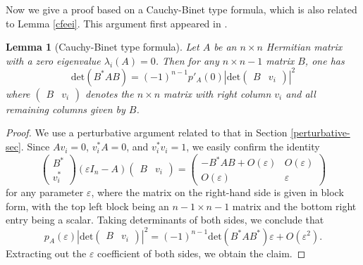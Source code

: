 \documentclass{amsart}
\newcommand\eps{\varepsilon}
\newtheorem{lemma}{Lemma}
\begin{document}
Now we give a proof based on a Cauchy-Binet type formula, which is also related to Lemma \ref{cfeei}.  This argument first appeared in \cite{DPTZ}.

\begin{lemma}[Cauchy-Binet type formula]\label{cbtf}  Let $A$ be an $n \times n$ Hermitian matrix with a zero eigenvalue $\lambda_i(A) = 0$.  Then for any $n \times n-1$ matrix $B$, one has
$$ \mathrm{det}( B^* A B ) = (-1)^{n-1} p'_A(0) \left| \mathrm{det} \begin{pmatrix} B & v_i \end{pmatrix} \right|^2 $$
where $\begin{pmatrix} B & v_i \end{pmatrix}$ denotes the $n \times n$ matrix with right column $v_i$ and all remaining columns given by $B$.
\end{lemma}

\begin{proof} We use a perturbative argument related to that in Section \ref{perturbative-sec}.  Since $A v_i = 0$, $v_i^* A = 0$, and $v_i^* v_i = 1$, we easily confirm the identity
$$ \begin{pmatrix} B^* \\ v_i^* \end{pmatrix} (\eps I_n-A) \begin{pmatrix} B & v_i \end{pmatrix} = \begin{pmatrix} -B^* A B +O(\eps)& O(\eps) \\ O(\eps) & \eps \end{pmatrix}$$
for any parameter $\eps$, where the matrix on the right-hand side is given in block form, with the top left block being an $n-1 \times n-1$ matrix and the bottom right entry being a scalar.  Taking determinants of both sides, we conclude that
$$ p_A(\eps) \left| \mathrm{det} \begin{pmatrix} B & v_i \end{pmatrix} \right|^2 = (-1)^{n-1} \mathrm{det}( B^* A B^* ) \eps + O(\eps^2).$$
Extracting out the $\eps$ coefficient of both sides, we obtain the claim.
\end{proof}
\end{document}
